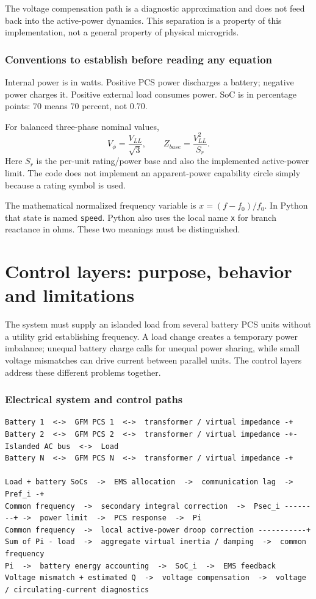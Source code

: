 \documentclass[11pt,a4paper]{article}
\begin{document}
The voltage compensation path is a diagnostic approximation and does not feed back into the active-power dynamics. This separation is a property of this implementation, not a general property of physical microgrids.

\section{Conventions to establish before reading any equation}
Internal power is in watts. Positive PCS power discharges a battery; negative power charges it. Positive external load consumes power. SoC is in percentage points: 70 means 70 percent, not 0.70.

For balanced three-phase nominal values,
\begin{equation}
V_\phi=\frac{V_{LL}}{\sqrt{3}},\qquad Z_{base}=\frac{V_{LL}^2}{S_r}.
\end{equation}
Here $S_r$ is the per-unit rating/power base and also the implemented active-power limit. The code does not implement an apparent-power capability circle simply because a rating symbol is used.

The mathematical normalized frequency variable is $x=(f-f_0)/f_0$. In Python that state is named \texttt{speed}. Python also uses the local name \texttt{x} for branch reactance in ohms. These two meanings must be distinguished.

\clearpage
\part{Control layers: purpose, behavior and limitations}


The system must supply an islanded load from several battery PCS units without a utility grid establishing frequency. A load change creates a temporary power imbalance; unequal battery charge calls for unequal power sharing, while small voltage mismatches can drive current between parallel units. The control layers address these different problems together.

\section{Electrical system and control paths}

\begin{lstlisting}[language={}]
Battery 1  <->  GFM PCS 1  <->  transformer / virtual impedance -+
Battery 2  <->  GFM PCS 2  <->  transformer / virtual impedance -+- Islanded AC bus  <->  Load
Battery N  <->  GFM PCS N  <->  transformer / virtual impedance -+

Load + battery SoCs  ->  EMS allocation  ->  communication lag  ->  Pref_i -+
Common frequency  ->  secondary integral correction  ->  Psec_i --------+ ->  power limit  ->  PCS response  ->  Pi
Common frequency  ->  local active-power droop correction -----------+
Sum of Pi - load  ->  aggregate virtual inertia / damping  ->  common frequency
Pi  ->  battery energy accounting  ->  SoC_i  ->  EMS feedback
Voltage mismatch + estimated Q  ->  voltage compensation  ->  voltage / circulating-current diagnostics
\end{lstlisting}
\end{document}
